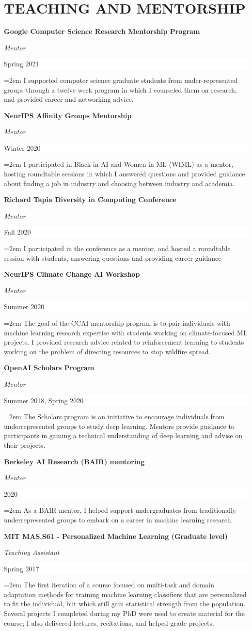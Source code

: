 \documentclass[paper=letter,fontsize=11pt]{scrartcl} %
\newcommand{\sepspace}{\vspace*{1em}}		%
\newcommand{\NewPart}[2]{\section*{\uppercase{#1} #2}}
\newcommand{\CourseEntry}[4]{
		\noindent \textbf{#1} \par
		\noindent \textit{#3} \hfill      %
		\colorbox{White}{%
			\parbox{6em}{%
			\hfill\color{Black}#2}} \par  %
		\noindent\hangindent=2em\hangafter=0 \small #4 %
		\normalsize \par}
\begin{document}
\NewPart{Teaching and Mentorship}{}
\CourseEntry{Google Computer Science Research Mentorship Program}{Spring 2021}{Mentor}
{I supported computer science graduate students from under-represented groups through a twelve week program in which I counseled them on research, and provided career and networking advice.}
\sepspace

\CourseEntry{NeurIPS Affinity Groups Mentorship}{Winter 2020}{Mentor}
{I participated in Black in AI and Women in ML (WIML) as a mentor, hosting roundtable sessions in which I answered questions and provided guidance about finding a job in industry and choosing between industry and academia.}
\sepspace

\CourseEntry{Richard Tapia Diversity in Computing Conference}{Fall 2020}{Mentor}
{I participated in the conference as a mentor, and hosted a roundtable session with students, answering questions and providing career guidance}
\sepspace

\CourseEntry{NeurIPS Climate Change AI Workshop}{Summer 2020}{Mentor}
{The goal of the CCAI mentorship program is to pair individuals with machine learning research expertise with students working on climate-focused ML projects. I provided research advice related to reinforcement learning to students working on the problem of directing resources to stop wildfire spread.}
\sepspace

\CourseEntry{OpenAI Scholars Program}{Summer 2018, Spring 2020}{Mentor}
{The Scholars program is an initiative to encourage individuals from underrepresented groups to study deep learning. Mentors provide guidance to participants in gaining a technical understanding of deep learning and advise on their projects.}
\sepspace

\CourseEntry{Berkeley AI Research (BAIR) mentoring}{2020}{Mentor}
{As a BAIR mentor, I helped support undergraduates from traditionally underrepresented groups to embark on a career in machine learning research.}
\sepspace

\CourseEntry{MIT MAS.S61 - Personalized Machine Learning (Graduate level)}{Spring 2017}{Teaching Assistant}
{The first iteration of a course focused on multi-task and domain adaptation methods for training machine learning classifiers that are personalized to fit the individual, but which still gain statistical strength from the population. Several projects I completed during my PhD were used to create material for the course; I also delivered lectures, recitations, and helped grade projects.}
\sepspace
\end{document}
